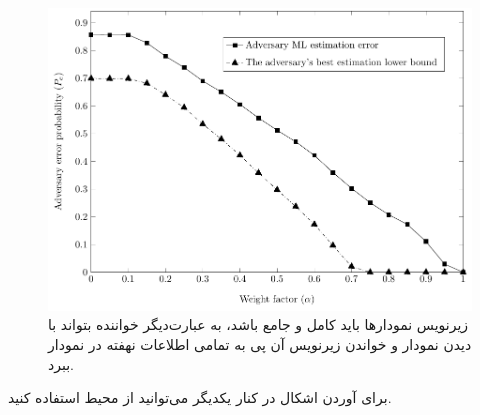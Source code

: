 \documentclass{CSICC}
\begin{document}
\begin{figure}
\includegraphics[width=.9\linewidth]{Images/sumXYPlot}
\caption{
زیرنویس نمودارها باید کامل و جامع باشد، به عبارت‌دیگر خواننده بتواند با دیدن نمودار و خواندن زیرنویس آن پی به تمامی اطلاعات نهفته در نمودار ببرد.}
\label{fig:sumXYPlot}
\end{figure}
برای آوردن اشکال در کنار یکدیگر می‌توانید از محیط  استفاده کنید. 
\end{document}
